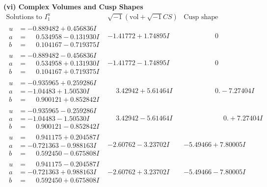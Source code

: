 \documentclass[1p]{elsarticle_modified}
\theoremstyle{definition}
\newcommand{\I}{\sqrt{-1}}
\begin{document}
\newpage\flushleft \textbf{(vi) Complex Volumes and Cusp Shapes}
$$\begin{array}{c|c|c}  
\text{Solutions to }I^u_{1}& \I (\text{vol} + \sqrt{-1}CS) & \text{Cusp shape}\\
 \hline 
\begin{aligned}
u &= -0.889482 + 0.456836 I \\
a &= \phantom{-}0.534958 - 0.131930 I \\
b &= \phantom{-}0.104167 - 0.719375 I\end{aligned}
 & -1.41772 + 1.74895 I & \phantom{-0.000000 } 0 \\ \hline\begin{aligned}
u &= -0.889482 - 0.456836 I \\
a &= \phantom{-}0.534958 + 0.131930 I \\
b &= \phantom{-}0.104167 + 0.719375 I\end{aligned}
 & -1.41772 - 1.74895 I & \phantom{-0.000000 } 0 \\ \hline\begin{aligned}
u &= -0.935965 + 0.259286 I \\
a &= -1.04483 + 1.50530 I \\
b &= \phantom{-}0.900121 + 0.852842 I\end{aligned}
 & \phantom{-}3.42942 + 5.61464 I & \phantom{-0.000000 } 0. - 7.27404 I \\ \hline\begin{aligned}
u &= -0.935965 - 0.259286 I \\
a &= -1.04483 - 1.50530 I \\
b &= \phantom{-}0.900121 - 0.852842 I\end{aligned}
 & \phantom{-}3.42942 - 5.61464 I & \phantom{-0.000000 -}0. + 7.27404 I \\ \hline\begin{aligned}
u &= \phantom{-}0.941175 + 0.204587 I \\
a &= -0.721363 - 0.988163 I \\
b &= \phantom{-}0.592450 - 0.675808 I\end{aligned}
 & -2.60762 - 3.23702 I & -5.49466 + 7.80005 I \\ \hline\begin{aligned}
u &= \phantom{-}0.941175 - 0.204587 I \\
a &= -0.721363 + 0.988163 I \\
b &= \phantom{-}0.592450 + 0.675808 I\end{aligned}
 & -2.60762 + 3.23702 I & -5.49466 - 7.80005 I \\ \hline\begin{aligned}

\end{aligned}
\end{array}$$
\end{document}
